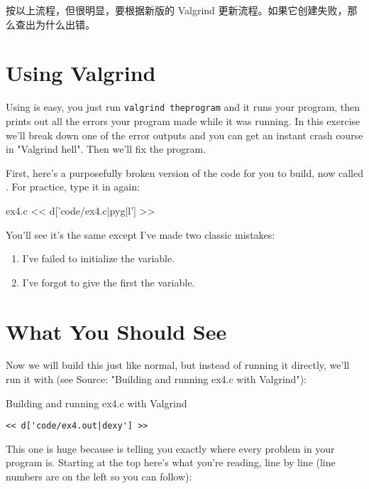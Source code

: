 按以上流程，但很明显，要根据新版的 Valgrind 更新流程。如果它创建失败，那么查出为什么出错。

\section{Using Valgrind}

Using  is easy, you just run \verb|valgrind theprogram| and
it runs your program, then prints out all the errors your program made while it
was running.  In this exercise we'll break down one of the error outputs and
you can get an instant crash course in "Valgrind hell".  Then we'll fix the
program.

First, here's a purposefully broken version of the  code
for you to build, now called .  For practice, type it
in again:

\begin{code}{ex4.c}
<< d['code/ex4.c|pyg|l'] >>
\end{code}

You'll see it's the same except I've made two classic mistakes:

\begin{enumerate}
\item I've failed to initialize the  variable.
\item I've forgot to give the first  the  variable.
\end{enumerate}

\section{What You Should See}

Now we will build this just like normal, but instead of running it
directly, we'll run it with  (see Source: "Building and running ex4.c with Valgrind"):

\begin{Terminal}{Building and running ex4.c with Valgrind}
\begin{lstlisting}
<< d['code/ex4.out|dexy'] >>
\end{lstlisting}
\end{Terminal}

This one is huge because  is telling you exactly where
every problem in your program is.  Starting at the top here's what you're
reading, line by line (line numbers are on the left so you can follow):

